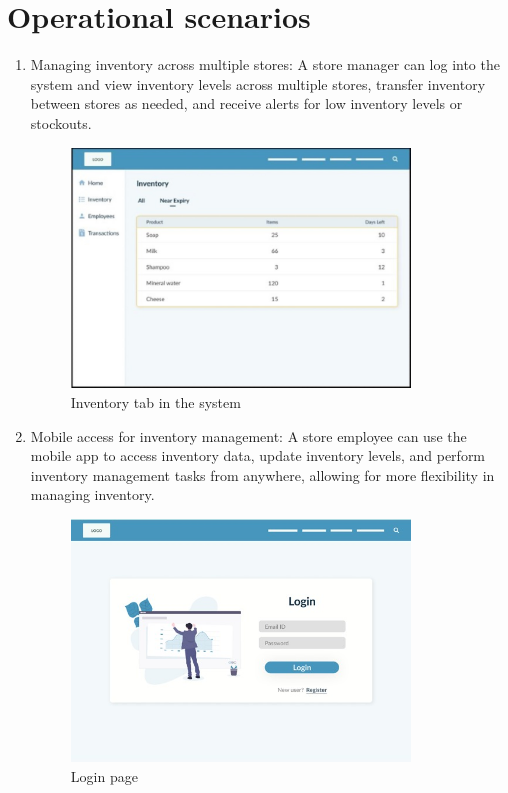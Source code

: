 \chapter{Operational scenarios \\ 
\label{Chapter::Operationalscenarios}} 
\begin{enumerate}
    \item Managing inventory across multiple stores: A store manager can log into the system and view inventory levels across multiple stores, transfer inventory between stores as needed, and receive alerts for low inventory levels or stockouts.


\begin{figure}[H]
  \centering
   \includegraphics[width=9cm]{Figures/Figma2.jpeg}
  \caption{Inventory tab in the system}
\label{}
\end{figure}

    \item Mobile access for inventory management: A store employee can use the mobile app to access inventory data, update inventory levels, and perform inventory management tasks from anywhere, allowing for more flexibility in managing inventory.

    \begin{figure}[H]
  \centering
   \includegraphics[width=9cm]{Figures/Figma4.jpeg}
  \caption{Login page}
\label{}
\end{figure}


\end{enumerate}
